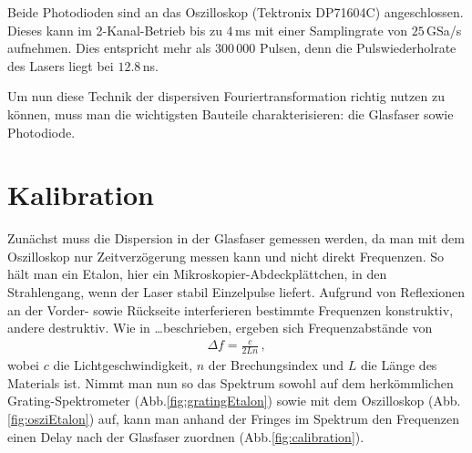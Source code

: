 \documentclass[bachelor,       %
               twoside,        %
               BCOR10mm,       %
               english,ngerman, %
               ]{GAUBM}
\begin{document}
Beide Photodioden sind an das Oszilloskop (Tektronix DP71604C) angeschlossen.
Dieses kann im 2-Kanal-Betrieb bis zu $4\,$ms mit einer Samplingrate von $25\,$GSa/s aufnehmen.
Dies entspricht mehr als 300\,000 Pulsen, denn die Pulswiederholrate des Lasers liegt bei $12.8\,$ns.


Um nun diese Technik der dispersiven Fouriertransformation richtig nutzen zu können, muss man die wichtigsten Bauteile charakterisieren: die Glasfaser sowie Photodiode.

\section{Kalibration}
Zunächst muss die Dispersion in der Glasfaser gemessen werden, da man mit dem Oszilloskop nur Zeitverzögerung messen kann und nicht direkt Frequenzen.
So hält man ein Etalon, hier ein Mikroskopier-Abdeckplättchen, in den Strahlengang, wenn der Laser stabil Einzelpulse liefert.
Aufgrund von Reflexionen an der Vorder- sowie Rückseite interferieren bestimmte Frequenzen konstruktiv, andere destruktiv.
Wie in \dots beschrieben, ergeben sich Frequenzabstände von
\begin{align*}
	\Delta f=\frac{c}{2Ln}\,,
\end{align*}
wobei $c$ die Lichtgeschwindigkeit, $n$ der Brechungsindex und $L$ die Länge des Materials ist.
Nimmt man nun so das Spektrum sowohl auf dem herkömmlichen Grating-Spektrometer (Abb.\ref{fig:gratingEtalon}) sowie mit dem Oszilloskop (Abb.\ref{fig:osziEtalon}) auf, kann man anhand der Fringes im Spektrum den Frequenzen einen Delay nach der Glasfaser zuordnen (Abb.\ref{fig:calibration}).
\end{document}
